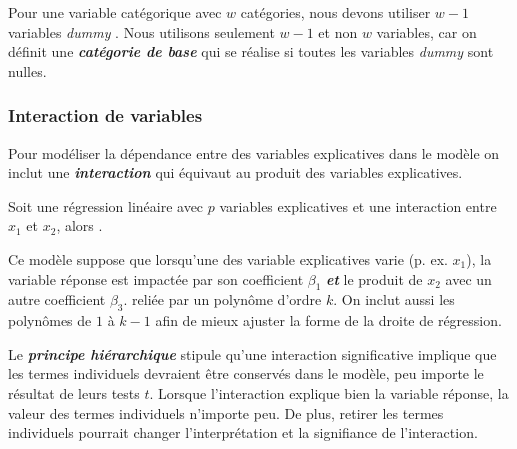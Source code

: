 \documentclass[french]{article}
\begin{document}
\begin{multicols*}{2}
\begin{definitionNOHFILL}
\bigskip

Pour une variable catégorique avec $w$ catégories, nous devons utiliser $w - 1$ variables \og \textit{dummy} \fg{}. Nous utilisons seulement $w -  1$ et non $w$ variables, car on définit une \textbf{\textit{catégorie de base}} qui se réalise si toutes les variables \og \textit{dummy} \fg{} sont nulles.
\end{definitionNOHFILL}



\subsubsection{Interaction de variables}
\begin{rappel_enhanced}[Contexte]
Pour modéliser la dépendance entre des variables explicatives dans le modèle on inclut une \textbf{\textit{interaction}} qui équivaut au produit des variables explicatives. 
\end{rappel_enhanced}

\begin{definitionNOHFILLsub}
Soit une régression linéaire avec $p$ variables explicatives et une interaction entre $x_{1}$ et $x_{2}$, alors . 

\bigskip

Ce modèle suppose que lorsqu'une des variable explicatives varie (p. ex. $x_{1}$), la variable réponse est impactée par son coefficient $\beta_{1}$ \textbf{\textit{et}} le produit de $x_{2}$ avec un autre coefficient $\beta_{3}$. reliée par un polynôme d'ordre $k$. On inclut aussi les polynômes de $1$ à $k - 1$ afin de mieux ajuster la forme de la droite de régression.
\end{definitionNOHFILLsub}


\begin{definitionNOHFILL}
Le \textbf{\textit{principe hiérarchique}} stipule qu'une interaction significative implique que les termes individuels devraient être conservés dans le modèle, peu importe le résultat de leurs tests $t$. Lorsque l'interaction explique bien la variable réponse, la valeur des termes individuels n'importe peu. De plus, retirer les termes individuels pourrait changer l'interprétation et la signifiance de l'interaction. 
\end{definitionNOHFILL}




\end{multicols*}
\end{document}

